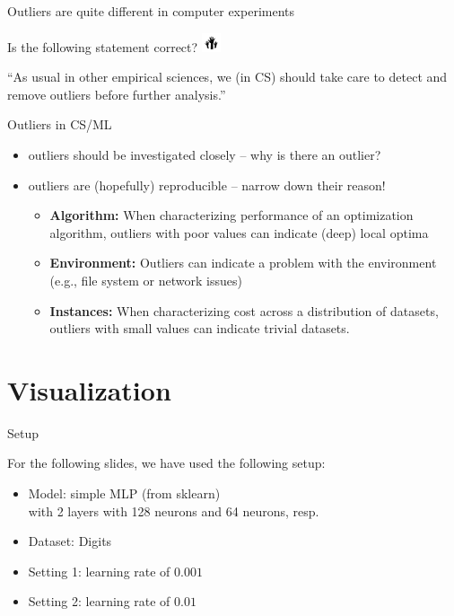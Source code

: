 \begin{frame}[c]{Outliers are quite different in computer experiments}

Is the following statement correct? \includegraphics[height=1.5em]{images/hands}

``As usual in other empirical sciences, we (in CS) should take care to \alert{detect and remove outliers} before further analysis.''

\pause
\bigskip

\begin{block}{Outliers in CS/ML}
\begin{itemize}
	\item outliers should be investigated closely -- why is there an outlier?
	\item outliers are (hopefully) reproducible -- narrow down their reason!
	\pause
	\begin{itemize}
		\item \textbf{Algorithm:} When characterizing performance of an optimization algorithm, \alert{outliers with poor values can indicate (deep) local optima}
		\pause
		\item \textbf{Environment:} Outliers can indicate a \alert{problem with the environment} (e.g., file system or network issues)
		\pause
		\item \textbf{Instances:}  When characterizing cost across a distribution of datasets, outliers with small values can indicate trivial datasets.
	\end{itemize}
\end{itemize}
\end{block}

\end{frame}
\section{Visualization}
\begin{frame}[c]{Setup}

For the following slides, we have used the following setup:

\begin{itemize}
	\item Model: simple MLP (from sklearn)\\ with 2 layers with 128 neurons and 64 neurons, resp.
	\item Dataset: Digits  
	\item Setting 1: learning rate of $0.001$ 
	\item Setting 2: learning rate of $0.01$
\end{itemize}


\end{frame}

